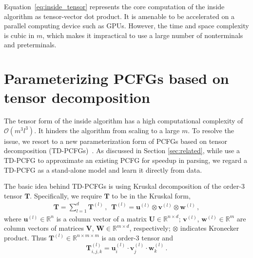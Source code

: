 \documentclass[11pt]{article}
\begin{document}
Equation~\ref{eq:inside_tensor} represents the core computation of the inside algorithm as tensor-vector dot product.
It is amenable to be accelerated on a parallel computing device such as GPUs.
However, the time and space complexity is cubic in $m$,
which makes it impractical to use a large number of nonterminals and preterminals.


\section{Parameterizing PCFGs based on tensor decomposition}\label{sec:td-pcfg}

The tensor form of the inside algorithm has a high computational complexity of $\mathcal{O}(m^3l^3)$.
It hinders the algorithm from scaling to a large $m$.
To resolve the issue, we resort to a new parameterization form of PCFGs based on tensor decomposition (TD-PCFGs)~\citep{cohen-etal-2013-approximate}.
As discussed in Section \ref{sec:related}, while \citet{cohen-etal-2013-approximate} use a TD-PCFG to approximate an existing PCFG for speedup in parsing,
we regard a TD-PCFG as a stand-alone model and learn it directly from data.

The basic idea behind TD-PCFGs is using Kruskal decomposition of the order-3 tensor $\mathbf{T}$.
Specifically, we require $\mathbf{T}$ to be in the Kruskal form, 
\begin{align}\label{eq:kruskal}
\mathbf{T} = \sum_{l = 1}^{d} \mathbf{T}^{(l)}\,,\,\,\, 
\mathbf{T}^{(l)} = \mathbf{u}^{(l)}\otimes\mathbf{v}^{(l)}\otimes\mathbf{w}^{(l)}\,,
\end{align}
where $\mathbf{u}^{(l)}\in\mathbb{R}^{n}$ is a column vector of a matrix $\mathbf{U}\in\mathbb{R}^{n\times d}$; $\mathbf{v}^{(l)}$, $\mathbf{w}^{(l)}\in\mathbb{R}^{m}$ are column vectors of matrices $\mathbf{V}$, $\mathbf{W}\in\mathbb{R}^{m\times d}$, respectively;
$\otimes$ indicates Kronecker product.
Thus $\mathbf{T}^{(l)}\in\mathbb{R}^{n\times m\times m}$ is an order-3 tensor 
and 
$$\mathbf{T}^{(l)}_{i, j, k} = \mathbf{u}^{(l)}_{i}\cdot\mathbf{v}^{(l)}_{j}\cdot\mathbf{w}^{(l)}_{k}\,.$$
\end{document}

